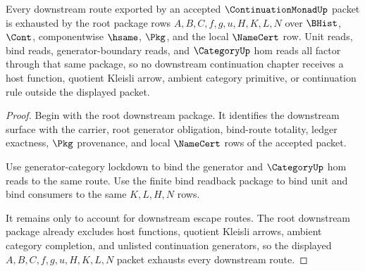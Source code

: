 \begin{theorem}
\label{thm:continuation-monad-downstream-route-exhaustion}
Every downstream route exported by an accepted $\ContinuationMonadUp$ packet is exhausted by the root package rows $A,B,C,f,g,u,H,K,L,N$ over $\BHist$, $\Cont$, componentwise $\hsame$, $\Pkg$, and the local $\NameCert$ row. Unit reads, bind reads, generator-boundary reads, and $\CategoryUp$ hom reads all factor through that same package, so no downstream continuation chapter receives a host function, quotient Kleisli arrow, ambient category primitive, or continuation rule outside the displayed packet.
\end{theorem}
\begin{proof}
Begin with the root downstream package. It identifies the downstream surface with the carrier, root generator obligation, bind-route totality, ledger exactness, $\Pkg$ provenance, and local $\NameCert$ rows of the accepted packet.

Use generator-category lockdown to bind the generator and $\CategoryUp$ hom reads to the same route. Use the finite bind readback package to bind unit and bind consumers to the same $K,L,H,N$ rows.

It remains only to account for downstream escape routes. The root downstream package already excludes host functions, quotient Kleisli arrows, ambient category completion, and unlisted continuation generators, so the displayed $A,B,C,f,g,u,H,K,L,N$ packet exhausts every downstream route.
\end{proof}


\begin{closurestatus}{\ContinuationMonadUp}
  \theoryclosure{\matureClosure}
  \formalstatus{\unformalizedV}
\end{closurestatus}
